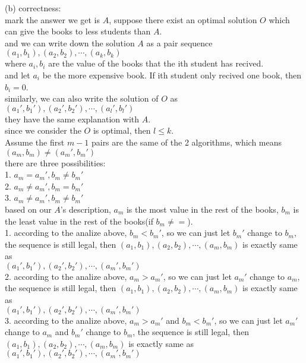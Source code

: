 \begin{solution}
(b) correctness:\\
mark the answer we get is $A$, suppose there exist an optimal solution $O$ which can give the books to less students than $A$.\\
and we can write down the solution $A$ as a pair sequence\\$(a_1,b_1),(a_2,b_2),\cdots,(a_k,b_k)$\\where $a_i,b_i$ are the value of the books that the ith student has recived.\\
and let $a_i$ be the more expensive book. If ith student only recived one book, then $b_i=0$.\\
similarly, we can also write the solution of $O$ as\\$(a_1',b_1'),(a_2',b_2'),\cdots,(a_l',b_l')$\\they have the same explanation with $A$.\\
since we consider the $O$ is optimal, then $l \leq k$.\\
Assume the first $m-1$ pairs are the same of the 2 algorithms, which means\\
$(a_m,b_m) \neq (a_m',b_m')$\\
there are three possibilities:\\
1. $a_m = a_m' , b_m \neq b_m'$\\
2. $a_m \neq a_m' , b_m = b_m'$\\
3. $a_m \neq a_m' , b_m \neq b_m'$\\
based on our $A$'s description, $a_m$ is the most value in the rest of the books, $b_m$ is the least value in the rest of the books(if $b_m \neq =$).\\
1. according to the analize above, $b_m < b_m'$, so we can just let $b_m'$ change to $b_m$, the sequence is still legal, then $(a_1,b_1),(a_2,b_2),\cdots,(a_m,b_m)$ is exactly same as \\$(a_1',b_1'),(a_2',b_2'),\cdots,(a_m',b_m')$\\
2. according to the analize above, $a_m > a_m'$, so we can just let $a_m'$ change to $a_m$, the sequence is still legal, then $(a_1,b_1),(a_2,b_2),\cdots,(a_m,b_m)$ is exactly same as \\$(a_1',b_1'),(a_2',b_2'),\cdots,(a_m',b_m')$\\
3. according to the analize above, $a_m > a_m'$ and $b_m < b_m'$, so we can just let $a_m'$ change to $a_m$ and  $b_m'$ change to $b_m$, the sequence is still legal, then $(a_1,b_1),(a_2,b_2),\cdots,(a_m,b_m)$ is exactly same as $(a_1',b_1'),(a_2',b_2'),\cdots,(a_m',b_m')$\\


\end{solution}
